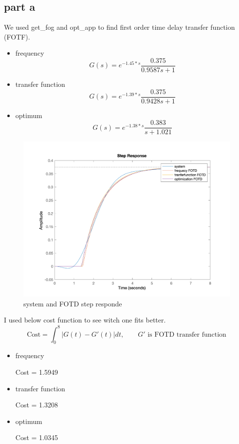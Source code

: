 \subsection{part a}

We used get\_fog and opt\_app to find first order time delay transfer function (FOTF).
\begin{itemize}
    \item frequency
    $$
    G(s) =  e^{-1.45*s} \dfrac{0.375}{0.9587s + 1}
    $$
    \item transfer function
    $$
    G(s) =  e^{-1.39*s} \dfrac{0.375}{0.9428s + 1}
    $$
    \item optimum
    $$
    G(s) =  e^{-1.38*s} \dfrac{0.383}{s + 1.021}
    $$
\end{itemize}
\begin{figure}[H]
    \caption{system and FOTD step responde}
    \centering
    \includegraphics[width=12cm]{../Figure/Q1/a/FOTD.png}
\end{figure}
I used below cost function to see witch one fits better.
$$
\text{Cost} = \int_{0}^{8} \vert G(t) - G'(t)\vert dt,\qquad \text{$G'$ is FOTD transfer function}
$$
\begin{itemize}
    \item frequency
    
    Cost = 1.5949
    \item transfer function
    
    Cost = 1.3208
    \item optimum
    
    Cost = 1.0345
\end{itemize}